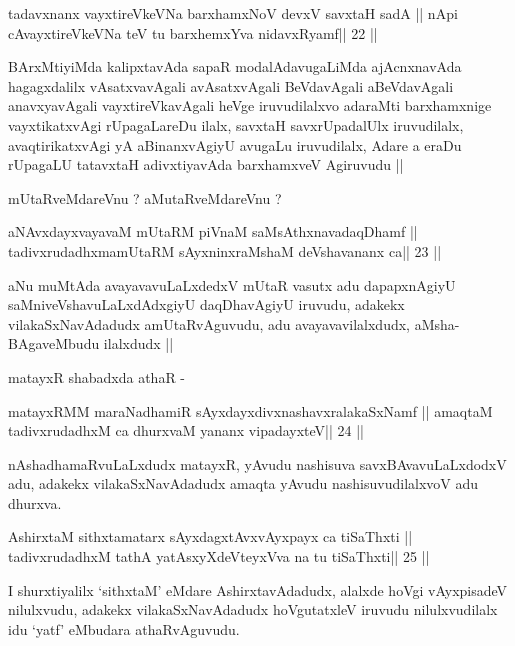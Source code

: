\begin{shl}
tadavxnanx vayxtireVkeVNa barxhamxNoV devxV savxtaH sadA ||
nApi cAvayxtireVkeVNa teV tu barxhemxYva nidavxRyamf\hfill || 22 ||
\end{shl}

\begin{artha}
BArxMtiyiMda kalipxtavAda sapaR modalAdavugaLiMda ajAcnxnavAda
hagagxdalilx vAsatxvavAgali avAsatxvAgali BeVdavAgali aBeVdavAgali
anavxyavAgali vayxtireVkavAgali heVge iruvudilalxvo adaraMti
barxhamxnige vayxtikatxvAgi rUpagaLareDu ilalx, savxtaH savxrUpadalUlx
iruvudilalx, avaqtirikatxvAgi yA aBinanxvAgiyU avugaLu iruvudilalx,
Adare a eraDu rUpagaLU tatavxtaH adivxtiyavAda barxhamxveV Agiruvudu
||

mUtaRveMdareVnu ? aMutaRveMdareVnu ?
\end{artha}

\begin{shl}
aNAvxdayxvayavaM mUtaRM piVnaM saMsAthxnavadaqDhamf ||
tadivxrudadhxmamUtaRM sAyxninxraMshaM deVshavananx ca\hfill || 23 ||
\end{shl}

\begin{artha}
aNu muMtAda avayavavuLaLxdedxV mUtaR vasutx adu dapapxnAgiyU
saMniveVshavuLaLxdAdxgiyU daqDhavAgiyU iruvudu, adakekx
vilakaSxNavAdadudx amUtaRvAguvudu, adu avayavavilalxdudx,
aMsha-BAgaveMbudu ilalxdudx ||

matayxR shabadxda athaR -
\end{artha}

\begin{shl}
matayxRMM maraNadhamiR sAyxdayxdivxnashavxralakaSxNamf ||
amaqtaM tadivxrudadhxM ca dhurxvaM yananx vipadayxteV\hfill || 24 ||
\end{shl}

\begin{artha}
nAshadhamaRvuLaLxdudx matayxR, yAvudu nashisuva savxBAvavuLaLxdodxV
adu, adakekx vilakaSxNavAdadudx amaqta yAvudu nashisuvudilalxvoV adu dhurxva.
\end{artha}

\begin{shl}
AshirxtaM sithxtamatarx sAyxdagxtAvx\s vAyxpayx ca tiSaThxti ||
tadivxrudadhxM tathA yatAsxyXdeVteyxVva na tu tiSaThxti\hfill || 25 ||
\end{shl}

\begin{artha}
I shurxtiyalilx `sithxtaM' eMdare AshirxtavAdadudx, alalxde hoVgi
vAyxpisadeV nilulxvudu, adakekx vilakaSxNavAdadudx hoVgutatxleV
iruvudu nilulxvudilalx idu `yatf' eMbudara athaRvAguvudu.
\end{artha}

